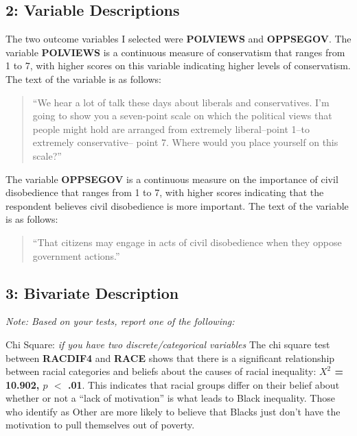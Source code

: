 \documentclass{article}
\begin{document}
\subsection*{2: Variable Descriptions}
The two outcome variables I selected were \textbf{POLVIEWS} and \textbf{OPPSEGOV}. The variable \textbf{POLVIEWS} is a continuous measure of conservatism that ranges from 1 to 7, with higher scores on this variable indicating higher levels of conservatism. The text of the variable is as follows:
\begin{quote}
``We hear a lot of talk these days about liberals and conservatives. I'm going to show you a seven-point scale on which the political views that people might hold are arranged from extremely liberal--point 1--to extremely conservative-- point 7. Where would you place yourself on this scale?''
\end{quote}

The variable \textbf{OPPSEGOV} is a continuous measure on the importance of civil disobedience that ranges from 1 to 7, with higher scores indicating that the respondent believes civil disobedience is more important. The text of the variable is as follows:
\begin{quote}
``That citizens may engage in acts of civil disobedience when they oppose government actions.''\newline
\end{quote}



\subsection*{3: Bivariate Description}

{\it{Note: Based on your tests, report one of the following:}}\newline

Chi Square: {\it{if you have two discrete/categorical variables}} \newline \newline
The chi square test between \textbf{RACDIF4} and \textbf{RACE} shows that there is a significant relationship between racial categories and beliefs about the causes of racial inequality: \textbf{$X^2$ = 10.902, $p$ $< $ .01}. This indicates that racial groups differ on their belief about whether or not a ``lack of motivation'' is what leads to Black inequality. Those who identify as Other are more likely to believe that Blacks just don't have the motivation to pull themselves out of poverty. \newline
\end{document}
